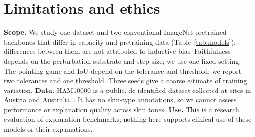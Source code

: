 \section{Limitations and ethics}
\label{sec:limitations}
\textbf{Scope.} We study one dataset and two conventional ImageNet-pretrained backbones that differ in
capacity and pretraining data (Table~\ref{tab:models}); differences between them are not attributed to
inductive bias. Faithfulness depends on the perturbation substrate and step size; we use one fixed
setting. The pointing game and IoU depend on the tolerance and threshold; we report two tolerances and
one threshold. Three seeds give a coarse estimate of training variation.
\textbf{Data.} HAM10000 is a public, de-identified dataset collected at sites in Austria and
Australia~\cite{tschandl2018ham10000}. It has no skin-type annotations, so we cannot assess performance
or explanation quality across skin tones. \textbf{Use.} This is a research evaluation of explanation
benchmarks; nothing here supports clinical use of these models or their explanations.
